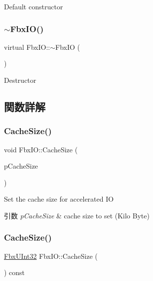 Default constructor \mbox{\label{class_fbx_i_o_a2f154dad101f0251a38f819222d01807}} 
\subsubsection{\texorpdfstring{$\sim$\+Fbx\+I\+O()}{~FbxIO()}}
{\footnotesize\ttfamily virtual Fbx\+I\+O\+::$\sim$\+Fbx\+IO (\begin{DoxyParamCaption}{ }\end{DoxyParamCaption})\hspace{0.3cm}{\ttfamily [virtual]}}

Destructor 

\subsection{関数詳解}
\mbox{\label{class_fbx_i_o_aa60c36412a1a48e44fbdb41fe9a31394}} 
\subsubsection{\texorpdfstring{Cache\+Size()}{CacheSize()}\hspace{0.1cm}{\footnotesize\ttfamily [1/2]}}
{\footnotesize\ttfamily void Fbx\+I\+O\+::\+Cache\+Size (\begin{DoxyParamCaption}\item[{\hyperlink{fbxtypes_8h_a53c19005808129cb4efa0dcbb71fdb09}{Fbx\+U\+Int32}}]{p\+Cache\+Size }\end{DoxyParamCaption})}

Set the cache size for accelerated IO 
\begin{DoxyParams}{引数}
{\em p\+Cache\+Size} & cache size to set (Kilo Byte) \\
\hline
\end{DoxyParams}
\mbox{\label{class_fbx_i_o_a8a06f9cca3b61b927401a1283e072ee4}} 
\subsubsection{\texorpdfstring{Cache\+Size()}{CacheSize()}\hspace{0.1cm}{\footnotesize\ttfamily [2/2]}}
{\footnotesize\ttfamily \hyperlink{fbxtypes_8h_a53c19005808129cb4efa0dcbb71fdb09}{Fbx\+U\+Int32} Fbx\+I\+O\+::\+Cache\+Size (\begin{DoxyParamCaption}{ }\end{DoxyParamCaption}) const}


